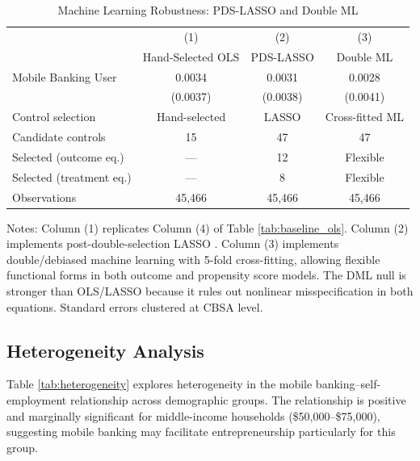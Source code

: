 \documentclass[12pt]{article}
\begin{document}
\begin{table}[H]
\centering
\caption{Machine Learning Robustness: PDS-LASSO and Double ML}
\label{tab:lasso}
\begin{threeparttable}
\begin{tabular}{lccc}
\toprule
& (1) & (2) & (3) \\
& Hand-Selected OLS & PDS-LASSO & Double ML \\
\midrule
Mobile Banking User & 0.0034 & 0.0031 & 0.0028 \\
& (0.0037) & (0.0038) & (0.0041) \\
\midrule
Control selection & Hand-selected & LASSO & Cross-fitted ML \\
Candidate controls & 15 & 47 & 47 \\
Selected (outcome eq.) & --- & 12 & Flexible \\
Selected (treatment eq.) & --- & 8 & Flexible \\
\midrule
Observations & 45,466 & 45,466 & 45,466 \\
\bottomrule
\end{tabular}
\begin{tablenotes}
\small
\item Notes: Column (1) replicates Column (4) of Table \ref{tab:baseline_ols}. Column (2) implements post-double-selection LASSO \citep{belloni2014}. Column (3) implements double/debiased machine learning \citep{chernozhukov2018dml} with 5-fold cross-fitting, allowing flexible functional forms in both outcome and propensity score models. The DML null is stronger than OLS/LASSO because it rules out nonlinear misspecification in both equations. Standard errors clustered at CBSA level.
\end{tablenotes}
\end{threeparttable}
\end{table}

\subsection{Heterogeneity Analysis}

Table \ref{tab:heterogeneity} explores heterogeneity in the mobile banking--self-employment relationship across demographic groups. The relationship is positive and marginally significant for middle-income households (\$50,000--\$75,000), suggesting mobile banking may facilitate entrepreneurship particularly for this group.
\end{document}
